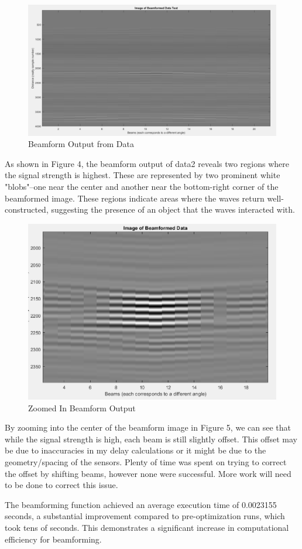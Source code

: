 \begin{figure}[H]
    \centering
    \includegraphics[width=0.5\linewidth]{figures/beamform_fig4.png}
    \caption{Beamform Output from Data}
    \label{fig:final_beamform_output}
\end{figure}

As shown in Figure 4, the beamform output of data2 reveals two regions where the signal strength is highest. These are represented by two prominent white "blobs"--one near the center and another near the bottom-right corner of the beamformed image. These regions indicate areas where the waves return well-constructed, suggesting the presence of an object that the waves interacted with.

\begin{figure}[H]
    \centering
    \includegraphics[width=0.5\linewidth]{figures/beamform_fig5.png}
    \caption{Zoomed In Beamform Output}
    \label{fig:zoomed_in_beamform_output}
\end{figure}

By zooming into the center of the beamform image in Figure 5, we can see that while the signal strength is high, each beam is still slightly offset. This offset may be due to inaccuracies in my delay calculations or it might be due to the geometry/spacing of the sensors. Plenty of time was spent on trying to correct the offset by shifting beams, however none were successful. More work will need to be done to correct this issue.


The beamforming function achieved an average execution time of 0.0023155 seconds, a substantial improvement compared to pre-optimization runs, which took tens of seconds. This demonstrates a significant increase in computational efficiency for beamforming.

